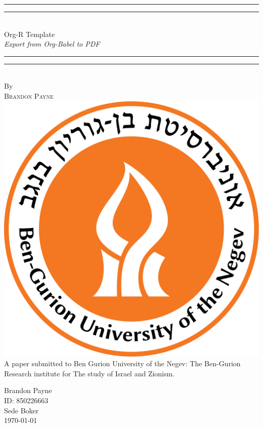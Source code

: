 %
\author{Brandon Payne}
%
\vspace*{13mm}
\begin{center}
\rule[0.5ex]{\linewidth}{2pt}\vspace*{-\baselineskip}\vspace*{3.2pt}
\rule[0.5ex]{\linewidth}{1pt}\\[\baselineskip]
{\Huge Org-R Template}\\[4mm]
{\Large \textit{Export from Org-Babel to PDF}}\\
\rule[0.5ex]{\linewidth}{1pt}\vspace*{-\baselineskip}\vspace{3.2pt}
\rule[0.5ex]{\linewidth}{2pt}\\
\vspace{6.5mm}
{\large By}\\
\vspace{6.5mm}
{\large\textsc{Brandon Payne}}\\
\vspace{11mm}
\includegraphics[scale=0.2]{bgu_logo}\\
\vspace{11mm}
A paper submitted to Ben Gurion University of the Negev: The Ben-Gurion Research institute for The study of Israel and Zionism.
\vspace{9mm}
{\large\textsc{}}
\vspace{12mm}
\end{center}
\begin{flushright}
{\Large Brandon Payne}\\
ID: 850226663\\
Sede Boker\\
{\large \today}
\end{flushright}
\clearpage